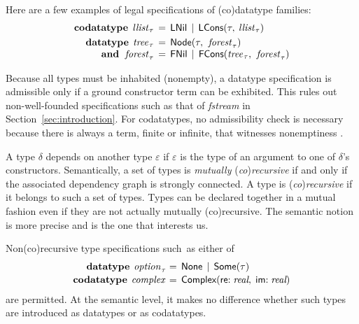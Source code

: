 \documentclass[smallcondensed,draft]{svjour3}
\newcommand\keyw[1]{\textbf{#1}}
\newcommand\const[1]{\textsf{#1}}
\newcommand\ty[1]{\textit{#1}}
\newcommand\vthinspace{\kern+0.083333em}
\begin{document}
Here are a few examples of legal specifications of (co)datatype families:
\[\begin{aligned}[t]
      \keyw{codatatype}\; \,\ty{llist}_{\vthinspace\tau} & \,=\, \const{LNil} \,\mid\, \const{LCons}(%
      \tau,\: %
      \ty{llist}_{\vthinspace\tau}) \\%
      \keyw{datatype}\;\, \ty{tree}_{\vthinspace\tau} & \,=\, \const{Node}(\tau,\:\, \ty{forest}_{\vthinspace\tau}) \\[-\jot]
      \keyw{and}\;\,\, \ty{forest}_{\vthinspace\tau} & \,=\, \const{FNil} \,\mid\, \const{FCons}(\ty{tree}_{\vthinspace\tau},\:\, \ty{forest}_{\vthinspace\tau})
\end{aligned}
\]

Because all types must be inhabited (nonempty), a datatype specification is
admissible only if a ground constructor term can be exhibited.
This rules out non-well-founded specifications such as
that of \ty{fstream} in Section~\ref{sec:introduction}.
For codatatypes, no admissibility check is necessary because there is always a term,
finite or infinite, that witnesses nonemptiness \cite{blanchette-et-al-2015-esop}.

A type $\delta$ depends on another type $\varepsilon$ if $\varepsilon$ is the
type of an argument to one of $\delta$'s constructors. Semantically, a set of
types is \emph{mutually} (\emph{co})\emph{recursive} if and only if the
associated dependency graph is strongly connected.
A type is (\emph{co})\emph{recursive} if it belongs to such a set of types.
Types can be declared together in a mutual fashion even if they are not actually
mutually (co)recursive. The semantic notion is more precise and is the one that interests
us.

Non(co)recursive type specifications such~as either of
\[\begin{aligned}[t]
      \keyw{datatype}~\vthinspace\ty{option}_{\vthinspace\tau\!} & \,=\, \const{None} \,\mid\, \const{Some}(\tau) \\[-.5\jot]
      \keyw{codatatype}~\vthinspace\ty{complex} & \,=\, \const{Complex}(\const{re}{:}\; \ty{real},\; \const{im}{:}\;\ty{real})
\end{aligned}
\]
are permitted.
At the semantic level, it makes no difference whether
such types are introduced as datatypes or as codatatypes.

%
%
\end{document}
